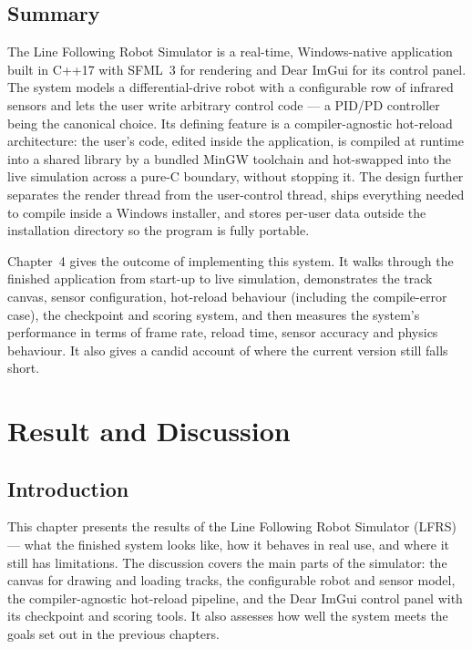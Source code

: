 \section{Summary}
The Line Following Robot Simulator is a real-time, Windows-native application built in C++17 with SFML~3 for rendering and Dear ImGui for its control panel. The system models a differential-drive robot with a configurable row of infrared sensors and lets the user write arbitrary control code --- a PID/PD controller being the canonical choice. Its defining feature is a compiler-agnostic hot-reload architecture: the user's code, edited inside the application, is compiled at runtime into a shared library by a bundled MinGW toolchain and hot-swapped into the live simulation across a pure-C boundary, without stopping it. The design further separates the render thread from the user-control thread, ships everything needed to compile inside a Windows installer, and stores per-user data outside the installation directory so the program is fully portable.

Chapter~4 gives the outcome of implementing this system. It walks through the finished application from start-up to live simulation, demonstrates the track canvas, sensor configuration, hot-reload behaviour (including the compile-error case), the checkpoint and scoring system, and then measures the system's performance in terms of frame rate, reload time, sensor accuracy and physics behaviour. It also gives a candid account of where the current version still falls short.

\setlength{\parskip}{1.5em}
\chapter{Result and Discussion}
\vspace{-5cm}

\section{Introduction}

This chapter presents the results of the Line Following Robot Simulator (LFRS) --- what the finished system looks like, how it behaves in real use, and where it still has limitations. The discussion covers the main parts of the simulator: the canvas for drawing and loading tracks, the configurable robot and sensor model, the compiler-agnostic hot-reload pipeline, and the Dear ImGui control panel with its checkpoint and scoring tools. It also assesses how well the system meets the goals set out in the previous chapters.

